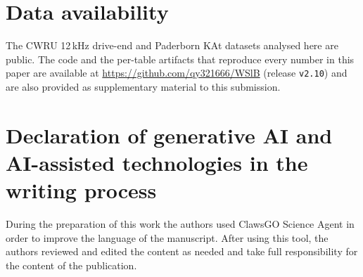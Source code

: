 \documentclass[preprint,12pt]{elsarticle}
\begin{document}
\section*{Data availability}
The CWRU 12\,kHz drive-end and Paderborn KAt datasets analysed here are public.
The code and the per-table artifacts that reproduce every number in this paper
are available at \url{https://github.com/qy321666/WSlB} (release \texttt{v2.10})
and are also provided as supplementary material to this
submission.

\section*{Declaration of generative AI and AI-assisted technologies in the writing process}
During the preparation of this work the authors used ClawsGO Science Agent in
order to improve the language of the manuscript. After using this tool, the
authors reviewed and edited the content as needed and take full responsibility
for the content of the publication.




\end{document}
